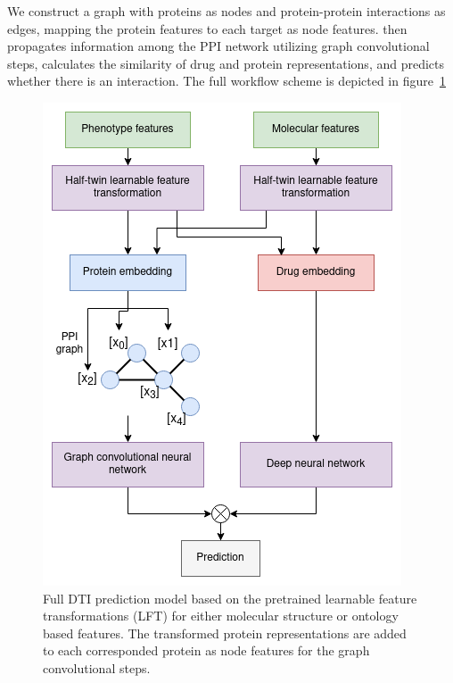 \documentclass{bioinfo}
\begin{document}
We construct a graph with proteins as nodes and protein-protein
interactions as edges, mapping the protein features to each target as
node features. \name{} then propagates information among the PPI network
utilizing graph convolutional steps, calculates the similarity of drug
and protein representations, and predicts whether there is an
interaction. The full workflow scheme is depicted in
figure~\ref{fig:ModelWorkflow}



\begin{figure}[!tpb]
	\centering
	\includegraphics[width=0.9\columnwidth]{figures/model_workflow.png}
	\caption{Full DTI prediction model based on the pretrained
          learnable feature transformations (LFT) for either molecular
          structure or ontology based features. The transformed
          protein representations are added to each corresponded
          protein as node features for the graph convolutional
          steps.}
	\label{fig:ModelWorkflow}
\end{figure}
\end{document}
